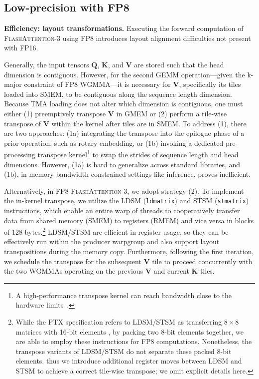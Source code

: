 \begin{algorithm}[H]
\begin{algorithmic}[1]
\subsection{Low-precision with FP8}
\label{sec:algofp8}

\textbf{Efficiency: layout transformations.} Executing the forward computation of \textsc{FlashAttention-3} using FP8 introduces layout alignment difficulties not present with FP16.

Generally, the input tensors $\mathbf{Q}$, $\mathbf{K}$, and $\mathbf{V}$ are stored such that the head dimension is contiguous. However, for the second GEMM operation—given the k-major constraint of FP8 WGMMA—it is necessary for $\mathbf{V}$, specifically its tiles loaded into SMEM, to be contiguous along the sequence length dimension. Because TMA loading does not alter which dimension is contiguous, one must either (1) preemptively transpose $\mathbf{V}$ in GMEM or (2) perform a tile-wise transpose of $\mathbf{V}$ within the kernel after tiles are in SMEM. To address (1), there are two approaches: (1a) integrating the transpose into the epilogue phase of a prior operation, such as rotary embedding, or (1b) invoking a dedicated pre-processing transpose kernel\footnote{A high-performance transpose kernel can reach bandwidth close to the hardware limits~\citep{colfax_cutlass_transpose_2024}.} to swap the strides of sequence length and head dimensions. However, (1a) is hard to generalize across standard libraries, and (1b), in memory-bandwidth-constrained settings like inference, proves inefficient.

Alternatively, in FP8 \textsc{FlashAttention-3}, we adopt strategy (2). To implement the in-kernel transpose, we utilize the LDSM (\verb|ldmatrix|) and STSM (\verb|stmatrix|) instructions, which enable an entire warp of threads to cooperatively transfer data from shared memory (SMEM) to registers (RMEM) and vice versa in blocks of 128 bytes.\footnote{While the PTX specification refers to LDSM/STSM as transferring $8 \times 8$ matrices with 16-bit elements \cite[\S 9.7.13.4.15-16]{ptx}, by packing two 8-bit elements together, we are able to employ these instructions for FP8 computations. Nonetheless, the transpose variants of LDSM/STSM do not separate these packed 8-bit elements, thus we introduce additional register moves between LDSM and STSM to achieve a correct tile-wise transpose; we omit explicit details here.} LDSM/STSM are efficient in register usage, so they can be effectively run within the producer warpgroup and also support layout transpositions during the memory copy. Furthermore, following the first iteration, we schedule the transpose for the subsequent $\mathbf{V}$ tile to proceed concurrently with the two WGMMAs operating on the previous $\mathbf{V}$ and current $\mathbf{K}$ tiles.


\end{algorithmic}
\end{algorithm}
